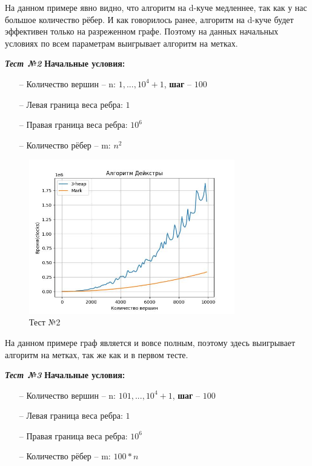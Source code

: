 \begin{text}
	На данном примере явно видно, что алгоритм на d-куче медленнее, так как у нас большое количество рёбер. И как говорилось ранее, алгоритм на d-куче будет эффективен только на разреженном графе. Поэтому на данных начальных условиях по всем параметрам выигрывает алгоритм на метках.\\
	
\begin{center}
\textbf{\textit{Тест №2}}
\textbf{Начальные условия:}

\begin{enumerate}
	\item[--] Количество вершин -- n: $1,...,10^4 + 1$, \textbf{шаг} -- $100$
	\item[--] Левая граница веса ребра: $1$
	\item[--] Правая граница веса ребра: $10^6$
	\item[--] Количество рёбер -- m: $n^2$ 
\end{enumerate}

\end{center}
\begin{figure}[h]
  \centering
  \includegraphics[width=0.8\textwidth]{pictures/2.jpeg}
  \caption{Тест №2}
  \label{fig:pict_2}
\end{figure}

На данном примере граф является и вовсе полным, поэтому здесь выигрывает алгоритм на метках, так же как и в первом тесте.\\
\newpage
\begin{center}
\textbf{\textit{Тест №3}}
\textbf{Начальные условия:}

\begin{enumerate}
	\item[--] Количество вершин -- n: $101,...,10^4 + 1$, \textbf{шаг} -- $100$
	\item[--] Левая граница веса ребра: $1$
	\item[--] Правая граница веса ребра: $10^6$
	\item[--] Количество рёбер -- m: $100*n$ 
\end{enumerate}


\end{center}
\end{text}
